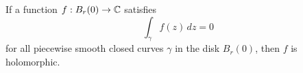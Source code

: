 \documentclass{homework}
\begin{document}
                                                                                                                                                                                                                                                                                                                                                    \begin{problem}\label{moreras-theorem}If a function $f : B_r(0) \to \mathbb{C}$
                                                                                                                                                                                                                                                                                                                                                      satisfies %
                                                                                                                                                                                                                                                                                                                                                        \[
                                                                                                                                                                                                                                                                                                                                                            \int_\gamma f(z) \, dz = 0
                                                                                                                                                                                                                                                                                                                                                              \]
                                                                                                                                                                                                                                                                                                                                                                for all piecewise smooth closed curves $\gamma$ in the disk
                                                                                                                                                                                                                                                                                                                                                                  $B_r(0)$, then $f$ is holomorphic.
                                                                                                                                                                                                                                                                                                                                                                  \end{problem}
\end{document}
